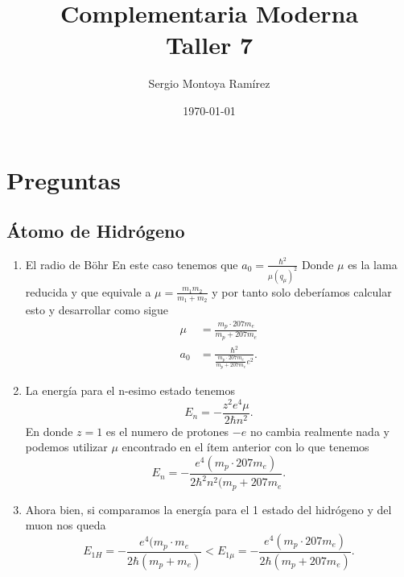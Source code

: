 \documentclass{report}
\title{\Huge{Complementaria Moderna}\\Taller 7}
\author{\huge{Sergio Montoya Ramírez}}
\date{\today}
\begin{document}
\maketitle
\newpage%
\tableofcontents
\pagebreak


\chapter{Preguntas}
\section{Átomo de Hidrógeno}

\sol

\begin{enumerate}
	\item El radio de B\"{o}hr
	En este caso tenemos que $a_0=\frac{\hbar^2}{\mu(q_\mu)^2}$ Donde $\mu$ es la lama reducida y que equivale a $\mu=\frac{m_1m_2}{m_1+m_2}$ y por tanto solo deberíamos calcular esto y desarrollar como sigue
	\begin{align*}
		\mu &= \frac{m_p\cdot 207m_e}{m_p+207m_e}\\
		a_0  &= \frac{\hbar^2}{\frac{m_p\cdot 207m_e}{m_p+207m_e}e^2} 
	.\end{align*}
\item La energía para el n-esimo estado tenemos \[
E_n = -\frac{z^2e^4\mu}{2\hbar n^2}
.\] En donde $z=1$ es el numero de protones $-e$ no cambia realmente nada y podemos utilizar $\mu$ encontrado en el ítem anterior con lo que tenemos \[
E_n = -\frac{e^4(m_p\cdot 207m_e)}{2\hbar^2n^2(m_p+207 m_e}
.\] 
\item Ahora bien, si comparamos la energía para el 1 estado del hidrógeno y del muon nos queda \[
		E_{1H} = -\frac{e^4(m_p\cdot m_e}{2\hbar(m_p + m_e)} < E_{1\mu} = -\frac{e^4(m_p\cdot 207m_e)}{2\hbar(m_p+207m_e)}
.\] 
\end{enumerate}
\end{document}
